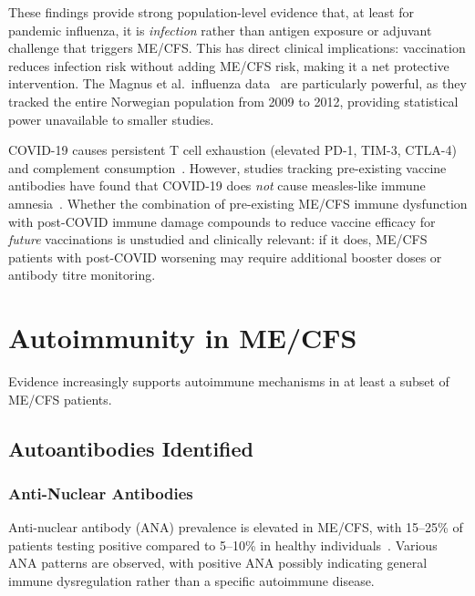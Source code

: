 These findings provide strong population-level evidence that, at least for pandemic influenza, it is \emph{infection} rather than antigen exposure or adjuvant challenge that triggers ME/CFS. This has direct clinical implications: vaccination reduces infection risk without adding ME/CFS risk, making it a net protective intervention. The Magnus et al.\ influenza data~\cite{Magnus2015influenza} are particularly powerful, as they tracked the entire Norwegian population from 2009 to 2012, providing statistical power unavailable to smaller studies.

\begin{open_question}
\label{q:postcovid-vaccine-efficacy}
COVID-19 causes persistent T cell exhaustion (elevated PD-1, TIM-3, CTLA-4)~\cite{Gil2023cd8} and complement consumption~\cite{Klein2024longcovid}. However, studies tracking pre-existing vaccine antibodies have found that COVID-19 does \emph{not} cause measles-like immune amnesia~\cite{Klein2024longcovid}. Whether the combination of pre-existing ME/CFS immune dysfunction with post-COVID immune damage compounds to reduce vaccine efficacy for \emph{future} vaccinations is unstudied and clinically relevant: if it does, ME/CFS patients with post-COVID worsening may require additional booster doses or antibody titre monitoring.
\end{open_question}

\section{Autoimmunity in ME/CFS}
\label{sec:autoimmunity}

Evidence increasingly supports autoimmune mechanisms in at least a subset of ME/CFS patients.

\subsection{Autoantibodies Identified}
\label{sec:autoantibodies}

\subsubsection{Anti-Nuclear Antibodies}

Anti-nuclear antibody (ANA) prevalence is elevated in ME/CFS, with 15--25\% of patients testing positive compared to 5--10\% in healthy individuals~\cite{Nishikai2007}. Various ANA patterns are observed, with positive ANA possibly indicating general immune dysregulation rather than a specific autoimmune disease.

